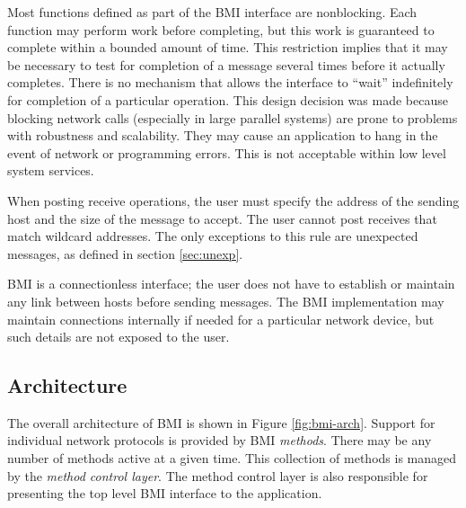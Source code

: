 \documentclass[11pt]{article}
\begin{document}
Most functions defined as part of the BMI interface are nonblocking.
Each function may perform work before completing, but this work is
guaranteed to complete within a bounded amount of time.  This restriction
implies that it may be necessary to test for completion of a message
several times before it actually completes.  There is no mechanism
that allows the interface to ``wait'' indefinitely for completion of
a particular operation.  This design decision was made because blocking
network calls (especially in large parallel systems) are prone to problems
with robustness and scalability.  They may cause an application to hang
in the event of network or programming errors.  This is not acceptable
within low level system services.

When posting receive operations, the user must specify the address of
the sending host and the size of the message to accept.  The user cannot
post receives that match wildcard addresses.  The only exceptions to
this rule are unexpected messages, as defined in section
\ref{sec:unexp}.

BMI is a connectionless interface; the user does not have to establish
or maintain any link between hosts before sending messages.  The BMI
implementation may maintain connections internally if needed for a
particular network device, but such details are not exposed to the user.

\subsection{Architecture}
\label{sec:arch}

The overall architecture of BMI is shown in Figure \ref{fig:bmi-arch}.
Support for individual network protocols is provided by BMI
\emph{methods}.  There may be any number of methods active at a given
time.  This collection of methods is managed by the \emph{method control
layer}.  The method control layer is also responsible for presenting the
top level BMI interface to the application.
\end{document}
